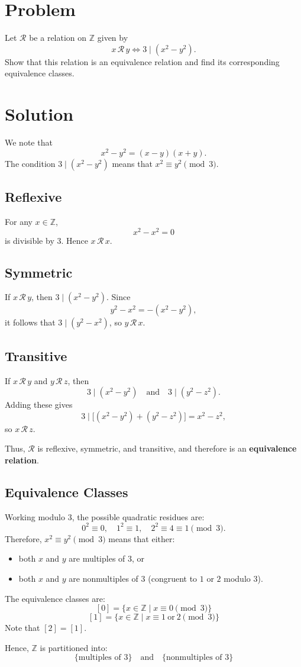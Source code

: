 \documentclass{article}
\begin{document}
\section*{Problem}
Let $\mathcal{R}$ be a relation on $\mathbb{Z}$ given by
\[
x \,\mathcal{R}\, y \iff 3 \mid (x^2 - y^2).
\]
Show that this relation is an equivalence relation and find its corresponding equivalence classes.

\section*{Solution}

We note that
\[
x^2 - y^2 = (x-y)(x+y).
\]
The condition $3 \mid (x^2 - y^2)$ means that $x^2 \equiv y^2 \pmod{3}$.

\subsection*{Reflexive}
For any $x \in \mathbb{Z}$,
\[
x^2 - x^2 = 0
\]
is divisible by $3$. Hence $x\,\mathcal{R}\,x$.

\subsection*{Symmetric}
If $x\,\mathcal{R}\,y$, then $3 \mid (x^2 - y^2)$.  
Since
\[
y^2 - x^2 = -(x^2 - y^2),
\]
it follows that $3 \mid (y^2 - x^2)$, so $y\,\mathcal{R}\,x$.

\subsection*{Transitive}
If $x\,\mathcal{R}\,y$ and $y\,\mathcal{R}\,z$, then
\[
3 \mid (x^2 - y^2) \quad \text{and} \quad 3 \mid (y^2 - z^2).
\]
Adding these gives
\[
3 \mid \big[ (x^2 - y^2) + (y^2 - z^2) \big] = x^2 - z^2,
\]
so $x\,\mathcal{R}\,z$.

\medskip
Thus, $\mathcal{R}$ is reflexive, symmetric, and transitive, and therefore is an \textbf{equivalence relation}.

\subsection*{Equivalence Classes}
Working modulo $3$, the possible quadratic residues are:
\[
0^2 \equiv 0, \quad 1^2 \equiv 1, \quad 2^2 \equiv 4 \equiv 1 \pmod{3}.
\]
Therefore, $x^2 \equiv y^2 \pmod{3}$ means that either:
\begin{itemize}
    \item both $x$ and $y$ are multiples of $3$, or
    \item both $x$ and $y$ are nonmultiples of $3$ (congruent to $1$ or $2$ modulo $3$).
\end{itemize}

The equivalence classes are:
\[
[0] = \{ x \in \mathbb{Z} \mid x \equiv 0 \pmod{3} \}
\]
\[
[1] = \{ x \in \mathbb{Z} \mid x \equiv 1 \ \text{or} \ 2 \pmod{3} \}
\]
Note that $[2] = [1]$.

\medskip
Hence, $\mathbb{Z}$ is partitioned into:
\[
\boxed{\{ \text{multiples of } 3 \} \quad \text{and} \quad \{ \text{nonmultiples of } 3 \}}
\]
\end{document}
